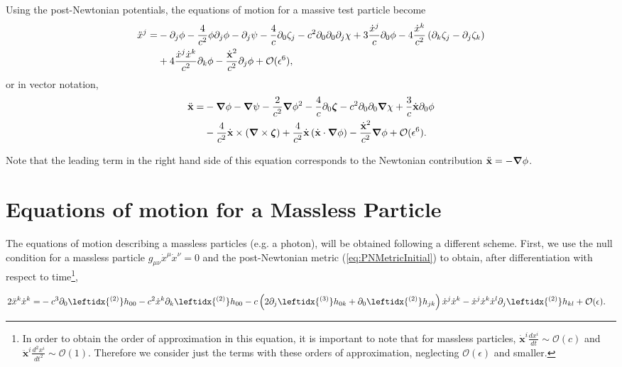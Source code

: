 Using the post-Newtonian potentials, the equations of motion for a massive test particle become
\begin{align}
\ddot{x}^j = &- \partial_j  \phi - \frac{4}{c^2} \phi \partial_j \phi - \partial_j \psi - \frac{4}{c} \partial_0 \zeta_j - c^2 \partial_0 \partial_0 \partial_j \chi + 3 \frac{\dot{x}^j}{c} \partial_0 \phi  -4 \frac{\dot{x}^k}{c^2} \left( \partial_k \zeta_j - \partial_j \zeta_k \right) \notag \\
& + 4 \frac{\dot{x}^j \dot{x}^k}{c^2} \partial_k \phi  -  \frac{\dot{\textbf{x}}^2}{c^2} \partial_j \phi + \mathcal{O} ( \epsilon^6 ),
\end{align}
or in vector notation,
\begin{align}
\ddot{\textbf{x}} = & - {\boldsymbol{\nabla}} \phi - {\boldsymbol{\nabla}} \psi - \frac{2}{c^2} {\boldsymbol{\nabla}} \phi^2 - \frac{4}{c} \partial_0 \boldsymbol{\zeta} - c^2 \partial_0 \partial_0 {\boldsymbol{\nabla}} \chi + \frac{3}{c} \dot{\textbf{x}} \partial_0 \phi \notag \\
& - \frac{4}{c^2} \dot{\textbf{x}} \times \left( {\boldsymbol{\nabla}} \times \boldsymbol{\zeta} \right) + \frac{4}{c^2} \dot{\textbf{x}} \left( \dot{\textbf{x}} \cdot {\boldsymbol{\nabla}} \phi \right) - \frac{\dot{\textbf{x}}^2}{c^2} {\boldsymbol{\nabla}} \phi + \mathcal{O} ( \epsilon^6 ).
\end{align}

Note that the leading term in the right hand side of this equation corresponds to the Newtonian contribution $\ddot{\textbf{x}} =  - {\boldsymbol{\nabla}} \phi $. 

\section{Equations of motion for a Massless Particle}
The equations of motion describing a massless particles (e.g. a photon), will be obtained following a different scheme. First, we use the null condition for a massless particle $g_{\mu \nu} \dot{x}^\mu \dot{x}^\nu = 0$ and the post-Newtonian metric (\ref{eq:PNMetricInitial}) to obtain, after differentiation with respect to time\footnote{In order to obtain the order of approximation in this equation, it is important to note that for massless particles, $\dot{\textbf{x}}^i \frac{dx^i}{dt} \sim \mathcal{O} (c)$ and $\ddot{\textbf{x}}^i \frac{d^2x^i}{dt^2} \sim \mathcal{O} (1)$. Therefore we consider just the terms with these orders of approximation, neglecting $\mathcal{O}(\epsilon)$ and smaller.}, 
\begin{footnotesize}
\begin{align}
2\ddot{x}^k \dot{x}^k = &- c^3 \partial_0 \leftidx{^{(2)}} h_{00} - c^2 \dot{x}^k \partial_k \leftidx{^{(2)}} h_{00} -c \left( 2\partial_j \leftidx{^{(3)}} h_{0k} + \partial_0 \leftidx{^{(2)}} h_{jk} \right) \dot{x}^j  \dot{x}^k - \dot{x}^j  \dot{x}^k \dot{x}^l \partial_j \leftidx{^{(2)}} h_{kl} + \mathcal{O}(\epsilon) . \label{eq:MasslessGeodesicAux1}
\end{align}
\end{footnotesize}

